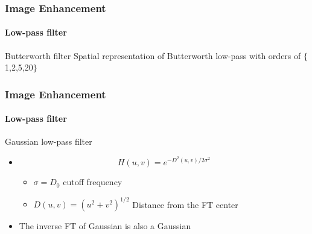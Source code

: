 \documentclass{beamer}
\begin{document}
\begin{frame}
\frametitle{Image Enhancement}
\framesubtitle{Low-pass filter}
\begin{block}{Butterworth filter}
\scriptsize{Spatial representation of Butterworth low-pass with orders of $\{$1,2,5,20$\}$}
\end{block}
\end{frame}
\begin{frame}
\frametitle{Image Enhancement}
\framesubtitle{Low-pass filter}
\begin{block}{Gaussian low-pass filter}

\begin{itemize}
\item[] 	$$ H(u,v) = e^{-D^{2}(u,v)/2\sigma^{2}}$$ 
\begin{itemize}
	\item $\sigma = D_{0}$ cutoff frequency 
	\item $D(u,v) = (u^2 + v^2)^{1/2}$ Distance from the FT center
\end{itemize}
\item The inverse FT of Gaussian is also a Gaussian\\
\end{itemize}

\end{block}
\end{frame}
\end{document}

